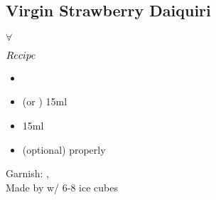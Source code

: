 \subsection{Virgin Strawberry Daiquiri}
\vspace{-8.mm}
\hspace{68mm}
$\forall$
\vspace{2.5mm}
\begin{itembox}[l]{\boldmath $Recipe$}
\begin{itemize}
\setlength{\parskip}{0cm}
\setlength{\itemsep}{0cm}
\item {}
\item \limj (or \lj) 15ml
\item \gumsyrup 15ml
\item \llsoda (optional) properly
\end{itemize}
\vspace{-4mm}
Garnish: \strawberry, \mint\\
Made by \blend w/ 6-8 ice cubes
\end{itembox}

